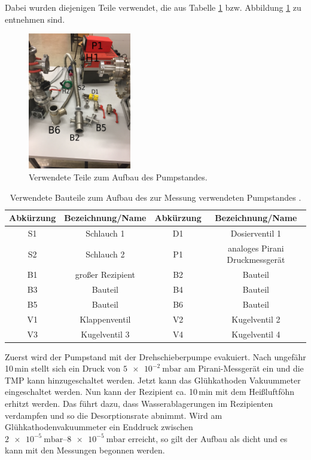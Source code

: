 Dabei wurden diejenigen Teile verwendet, die aus Tabelle \ref{tab:Teile} bzw. Abbildung
\ref{fig:Teile} zu entnehmen sind.

\begin{figure}
  \centering
  \includegraphics[width=0.4\textwidth]{IMG_6891.JPG}
  \caption{Verwendete Teile zum Aufbau des Pumpstandes.}
  \label{fig:Teile}
\end{figure}

\begin{table}
  \caption{Verwendete Bauteile zum Aufbau des zur Messung verwendeten Pumpstandes \cite{anleitung}.}
  \label{tab:Teile}
  \begin{tabular}{c c | c c}
    \toprule
    Abkürzung & Bezeichnung/Name & Abkürzung & Bezeichnung/Name \\
    \midrule
    S1 & Schlauch 1 & D1 & Dosierventil 1 \\
    S2 & Schlauch 2 & P1 & analoges Pirani Druckmessgerät \\
    B1 & großer Rezipient & B2 & Bauteil \\
    B3 & Bauteil & B4 & Bauteil \\
    B5 & Bauteil & B6 & Bauteil \\
    V1 & Klappenventil & V2 & Kugelventil 2 \\
    V3 & Kugelventil 3 & V4 & Kugelventil 4 \\
  \end{tabular}
\end{table}
Zuerst wird der Pumpstand mit der Drehschieberpumpe evakuiert. Nach ungefähr 10$\,$min
stellt sich ein Druck von $\SI{5e-2}{\milli\bar}$ am Pirani-Messgerät ein und die TMP kann hinzugeschaltet
werden.
Jetzt kann das Glühkathoden Vakuummeter eingeschaltet werden. Nun kann der Rezipient
ca. 10$\,$min mit dem Heißluftföhn erhitzt werden. Das führt dazu,
dass Wasserablagerungen im Rezipienten verdampfen und so die Desorptionsrate abnimmt.
Wird am Glühkathodenvakuummeter ein Enddruck zwischen $\SIrange{2e-5}{8e-5}{\milli\bar}$ erreicht, so gilt der
Aufbau als dicht und es kann mit den Messungen begonnen werden.

